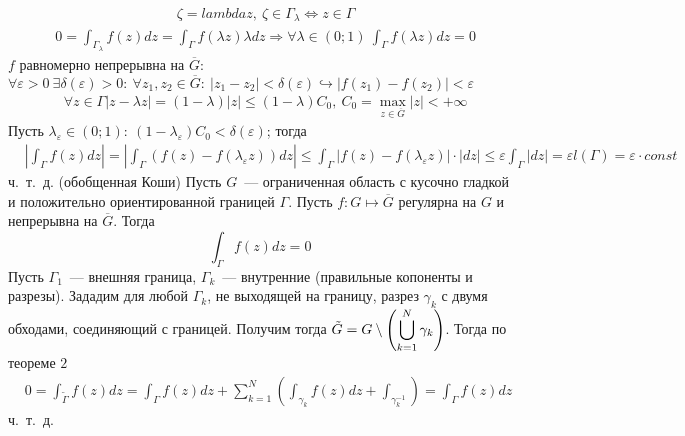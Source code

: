 \begin{align*}
  & \zeta = lambda z, \ \zeta \in \Gamma_{\lambda} \Leftrightarrow z \in \Gamma
\end{align*}
\begin{align*}
  & 0 = \int_{\Gamma_\lambda}f(z)dz = \int_{\Gamma}f(\lambda z)\lambda dz \Rightarrow \forall \lambda \in (0;1) \ \int_{\Gamma}f(\lambda z)dz = 0
\end{align*}
$f$ равномерно непрерывна на $\overline{G}$: $\forall \varepsilon > 0 \ \exists
\delta(\varepsilon) >0: \ \forall z_1, z_2 \in \overline{G}: \ \left| z_1-z_2
\right| < \delta(\varepsilon) \hookrightarrow \left| f(z_1) - f(z_2) \right| < \varepsilon$
\begin{align*}
  & \forall z \in \Gamma \left| z-\lambda z \right| = (1-\lambda) \left| z \right| \leq (1-\lambda)C_0, \ C_0 = \max_{z \in \overline{G}}\left| z \right| < +\infty
\end{align*}
Пусть $\lambda_{\varepsilon}\in(0;1): \ (1 -
\lambda_{\varepsilon})C_0<\delta(\varepsilon)$; тогда
\begin{align*}
  & \left| \int_{\Gamma}f(z)dz \right|= \left| \int_{\Gamma}\left( f(z)-f(\lambda_{\varepsilon}z) \right)dz \right|\leq \int_{\Gamma} \left| f(z) - f(\lambda_{\varepsilon}z) \right| \cdot \left| dz \right| \leq \varepsilon \int_{\Gamma} \left| dz \right| = \varepsilon l(\Gamma) = \varepsilon \cdot const
\end{align*}
ч.~т.~д.
\theorem (обобщенная Коши) Пусть $G$~--- ограниченная область с кусочно гладкой
и положительно ориентированной границей $\Gamma$. Пусть $f: G \mapsto
\overline{G}$ регулярна на $G$ и непрерывна на $\overline{G}$. Тогда
\begin{equation} \label{(7.5)}
  \int_{\Gamma}f(z)dz = 0
\end{equation}
\pr
Пусть $\Gamma_1$~--- внешняя граница, $\Gamma_k$~--- внутренние (правильные
копоненты и разрезы). Зададим для любой $\Gamma_k$, не выходящей на границу,
разрез $\gamma_k$ с двумя обходами, соединяющий с границей. Получим тогда
$\tilde{G} = G \setminus \left(\displaystyle \bigcup_{k=1}^N \gamma_k \right)$. Тогда по
теореме $2$
\begin{align*}
  & 0 = \int_{\tilde{\Gamma}}f(z)dz = \int_{\Gamma} f(z)dz + \sum_{k=1}^N\left( \int_{\gamma_k} f(z) dz + \int_{\gamma_k^{-1}} \right) = \int_{\Gamma} f(z) dz
\end{align*}
ч.~т.~д.
\\